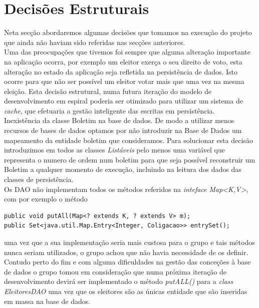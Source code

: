 \documentclass[a4paper,12pt]{report}
\begin{document}
\section{Decisões Estruturais}
Neta secção abordaremos algumas decisões que tomamos na execução do projeto que ainda não haviam sido referidas nas secções anteriores.
\\\indent Uma das preocupações que tivemos foi sempre que alguma alteração importante na aplicação ocorra, por exemplo um eleitor exerça o seu direito de voto, esta alteração no estado da aplicação seja refletida na persistência de dados. Isto ocorre para que não ser possível um eleitor votar mais que uma vez na mesma eleição. Esta decisão estrutural, numa futura iteração do modelo de desenvolvimento em espiral poderia ser otimizado para utilizar um sistema de \emph{cache}, que efetuaria a gestão inteligente das escritas em persistência. 
\\\indent Inexistência da classe Boletim na base de dados. De modo a utilizar menos recursos de bases de dados optamos por não introduzir na Base de Dados um mapeamento da entidade boletim que consideramos. Para solucionar esta decisão introduzimos em todos as classes \emph{Listáveis} pelo menos uma variável que representa o numero de ordem num boletim para que seja possível reconstruir um Boletim a qualquer momento de execução, incluindo na leitura dos dados das classes de persistência.
\\\indent Os DAO não implementam todos os métodos referidos na \emph{inteface} \emph{Map<K,V>}, com por exemplo o método 
\begin{verbatim}
public void putAll(Map<? extends K, ? extends V> m);
public Set<java.util.Map.Entry<Integer, Coligacao>> entrySet();
\end{verbatim}
uma vez que a sua implementação seria mais custosa para o grupo e tais métodos nunca seriam utilizados, o grupo achou que não havia necessidade de os definir. Contudo perto do fim e com alguma dificuldades na gestão das conceções à base de dados o grupo tomou em consideração que numa próxima iteração de desenvolvimento devirá ser implementado o método \emph{putALL()} para a \emph{class} \emph{EleitoresDAO} uma vez que os eleitores são as únicas entidade que são inseridas em massa na base de dados.  
\newpage
\end{document}
